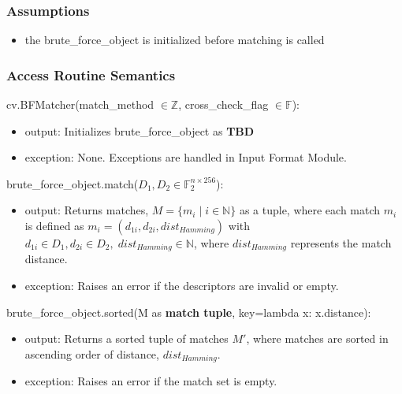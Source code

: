 \documentclass[12pt, titlepage]{article}
\begin{document}
\subsubsection{Assumptions}
\begin{itemize}
  \item the brute\_force\_object is initialized before matching is called 
\end{itemize}

\subsubsection{Access Routine Semantics}

\noindent cv.BFMatcher(match\_method $\in \mathbb{Z}$, cross\_check\_flag $\in \mathbb{F}$):
\begin{itemize}
\item output: Initializes brute\_force\_object  as \textbf{TBD}
\item exception: None. Exceptions are handled in Input Format Module.
\end{itemize}

\noindent brute\_force\_object.match($D_1, D_2 \in \mathbb{F}_{2}^{n \times 256}$):
\begin{itemize}
\item output: Returns matches, $ M = \{ m_i \mid i \in \mathbb{N} \} $ as a tuple, 
where each match \( m_i \) is defined as 
$m_i = (d_{1i}, d_{2i}, dist_{Hamming})$
with $d_{1i} \in D_1, d_{2i} \in D_2, \; dist_{Hamming} \in \mathbb{N}$, 
where $dist_{Hamming}$ represents the match distance.

\item exception: Raises an error if the descriptors are invalid or empty.
\end{itemize}

\noindent brute\_force\_object.sorted(M as \textbf{match tuple}, key=lambda x: x.distance): 
\begin{itemize} 
  \item output: Returns a sorted tuple of matches $M'$, where matches are sorted in 
  ascending order of distance, $dist_{Hamming}$. 
  \item exception: Raises an error if the match set is empty. 
\end{itemize}
\end{document}
